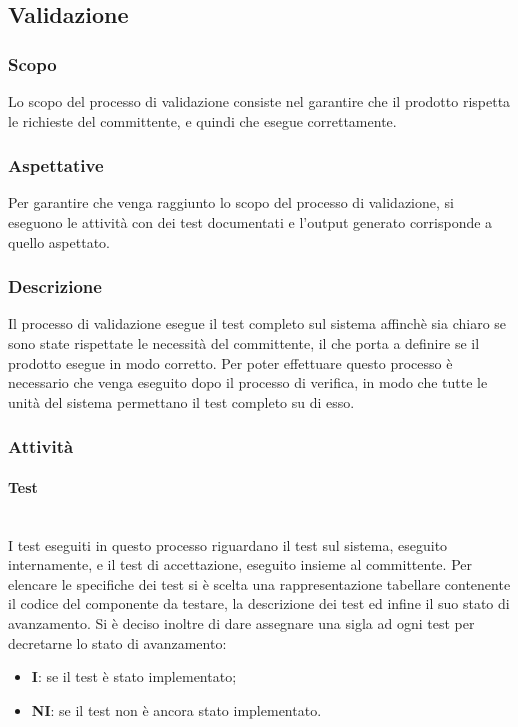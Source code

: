 \subsection{Validazione}

	\subsubsection{Scopo}
		Lo scopo del processo di validazione consiste nel garantire che il prodotto rispetta le richieste del committente, e quindi che esegue correttamente.
	\subsubsection{Aspettative}
		Per garantire che venga raggiunto lo scopo del processo di validazione, si eseguono le attività con dei test documentati e l'output generato corrisponde a quello aspettato.
	\subsubsection{Descrizione}
		Il processo di validazione esegue il test completo sul sistema affinchè sia chiaro se sono state rispettate le necessità del committente, il che porta a definire se il prodotto esegue in modo corretto. Per poter effettuare questo processo è necessario che venga eseguito dopo il processo di verifica, in modo che tutte le unità del sistema permettano il test completo su di esso. 
	\subsubsection{Attività}
		\paragraph{Test}\mbox{}\\
			I test eseguiti in questo processo riguardano il test sul sistema, eseguito internamente, e il test di accettazione, eseguito insieme al committente.
			Per elencare le specifiche dei test si è scelta una rappresentazione tabellare contenente il codice del componente da testare, la descrizione dei test ed infine il suo stato di avanzamento.
    Si è deciso inoltre di dare assegnare una sigla ad ogni test per decretarne lo stato di avanzamento:
    \begin{itemize}
        \item \textbf{I}: se il test è stato implementato;
        \item \textbf{NI}: se il test non è ancora stato implementato.
    \end{itemize}


